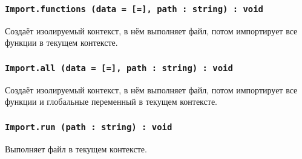 \subsubsection{\texttt{Import.functions (data = [=], path : string) : void}}

Создаёт изолируемый контекст, в нём выполняет файл, потом импортирует все функции в текущем контексте.

\subsubsection{\texttt{Import.all (data = [=], path : string) : void}}

Создаёт изолируемый контекст, в нём выполняет файл, потом импортирует все функции и глобальные переменный в текущем контексте.

\subsubsection{\texttt{Import.run (path : string) : void}}

Выполняет файл в текущем контексте.

